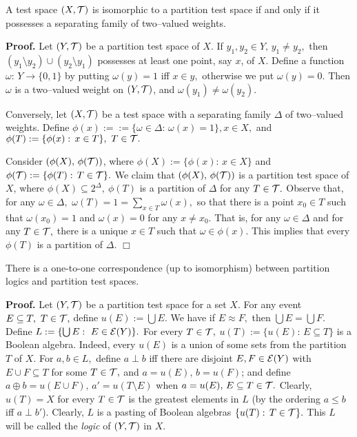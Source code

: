 \begin{theorem}\label{thm8.6} A test space $(X,{\cal T})$ is isomorphic
to a partition test space if and only if it possesses a
separating family of two--valued weights.
\end{theorem}

{\bf Proof.} Let $(Y,{\cal T})$ be a partition test space of
$X.$ If $y_1, y_2 \in Y,\, y_1 \ne y_2,$ then $(y_1 \setminus y_2)
\cup (y_2 \setminus y_1)$ possesses at least one point, say $x$,
of $X.$ Define a function $\omega:\, Y \to \{0,1\}$ by putting $\omega
(y) =1$ iff $x \in y,$  otherwise we put $\omega(y) = 0.$
Then $\omega$ is a two--valued weight on $(Y,{\cal T})$, and
$\omega(y_1) \ne \omega(y_2).$

Conversely, let $(X,{\cal T})$ be a test space with a separating
family $\Delta$ of two--valued weights. Define $\phi(x) :=
:=
\{\omega \in \Delta:\, \omega(x)= 1\}, x \in X,$ and $\phi(T) :=
\{\phi(x):\, x \in T\},\ T \in {\cal T}.$

Consider $(\phi (X),\, \phi({\cal T}))$, where $\phi(X) :=
\{\phi(x):\,
x \in X\}$ and $\phi({\cal T}) := \{\phi(T):\, T \in {\cal T}\}.$
We claim that $(\phi(X),\, \phi({\cal T}))$ is a partition
test space of $X$, where $\phi(X) \subseteq 2^{\Delta},\ \phi(T)$ is a
partition of $\Delta$ for any $T \in {\cal T}.$ Observe that,
for any $\omega \in \Delta,$ $\omega(T) = 1 = \sum_{x \in T} \omega(x),$
so that there is a point $x_0 \in T$ such that $\omega(x_0)=1$
and $\omega(x) = 0$ for any $x \ne x_0.$ That is, for any $\omega
\in \Delta$ and for any $T \in {\cal T},$ there is a unique $x
\in T$ such that $\omega \in \phi(x).$ This implies that every
$\phi(T)$ is a partition of $\Delta.$
\hfill $\Box$

\begin{theorem}\label{thm8.7} There is a one-to-one
correspondence (up to isomorphism) between partition logics and partition
test spaces.
\end{theorem}

{\bf Proof.} Let $(Y,{\cal T})$ be a partition test space for a
set $X.$ For any event $E \subseteq T,\ T \in {\cal T},$ define
$u(E) := \bigcup E.$ We have if $E \approx F,$ then $\bigcup E =
\bigcup F.$ Define $L:= \{ \bigcup E:\ E \in {\cal E}(Y)\}.$ For
every $T \in {\cal T},$ $u(T) := \{ u(E):\, E \subseteq T\}$ is a
Boolean algebra. Indeed, every $u(E)$ is a union of some sets
from the partition $T$ of $X.$ For $a,b \in L,$ define $a \perp
b$ iff there are disjoint $E,F \in {\cal E}(Y)$ with $E \cup F \subseteq T$
for some $T \in {\cal T},$ and $a = u(E),\, b = u(F)$; and define
$a\oplus b = u(E \cup F),\, a' =u(T \setminus E)$ when $a = u(E),\,
E \subseteq T \in {\cal T}.$ Clearly, $u(T) = X$ for every $T
\in {\cal T}$ is the greatest elements in $L$ (by the ordering
$a \le b$ iff $a \perp b'$). Clearly, $L$ is a pasting of Boolean
algebras $\{u(T):\, T \in {\cal T}\}.$ This $L$  will be called
the {\it logic} of $(Y, {\cal T})$ in $X.$

